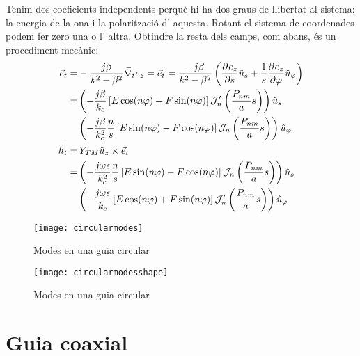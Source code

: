 Tenim dos coeficients independents perquè hi ha dos graus de llibertat al sistema: la energia de la ona i la polarització d' aquesta. Rotant el sistema de coordenades podem fer zero una o l' altra. Obtindre la resta dels camps, com abans, és un procediment mecànic:
\begin{subequations}
  \begin{align}
    \vec e_t =& -\frac{j \beta}{k^2 - \beta ^2} \vec \nabla _t  e_z =  \vec e_t = \frac{- j \beta}{k^2 - \beta ^2} \left ( \frac{\partial ^{}  e_z}{\partial s ^{}} \hat u_s + \frac{1}{s} \frac{\partial ^{} e_z}{\partial \varphi ^{}} \hat u_{\varphi} \right ) \nonumber \\
    =& \left(-\frac{ j \beta}{k_c} \left [ E \cos (n \varphi) + F \sin (n \varphi) \right ] \mathcal J _n ' \left( \frac{P_{nm}}{a} s \right) \right) \hat u_s  \nonumber\\
     & \left(-\frac{ j \beta }{k_c ^2 } \frac{n}{s} \left [ E \sin (n \varphi) - F \cos (n \varphi) \right ] \mathcal J _n \left(\frac{P_{nm}}{a} s \right) \right) \hat u_{\varphi} \\
    \vec h_t =& \, Y_{TM} \hat u_z \times \vec e_t \nonumber \\
    =& \left( -\frac{ j \omega \epsilon}{k_c^2} \frac{n}{s} \left [ E \sin (n \varphi) - F \cos (n \varphi) \right ] \mathcal J _n \left( \frac{P_{nm}}{a} s \right) \right) \hat u_s  \nonumber \\
     & \left (-\frac{ j \omega \epsilon }{k_c } \left [ E \cos (n \varphi) + F \sin (n \varphi) \right ] \mathcal J _n '\left(\frac{P_{nm}}{a} s \right) \right ) \hat u_{\varphi}
  \end{align}
  \label{circTM}
\end{subequations}

\begin{figure}[ht]
\begin{minipage}{8cm}
  \centering
  \texttt{[image: circularmodes]}
  \caption{Modes en una guia circular}
  \vspace{-1 em}
\end{minipage}
\begin{minipage}{8cm}
  \centering
  \texttt{[image: circularmodesshape]}
  \caption{Modes en una guia circular}
  \vspace{-1 em}
\end{minipage}
\end{figure}

\section{Guia coaxial}

